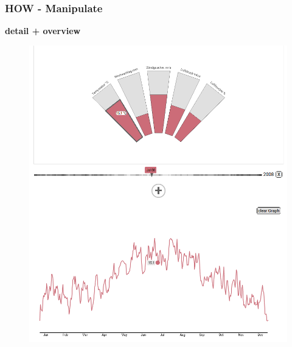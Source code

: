 \documentclass{beamer}
\begin{document}
  \begin{frame}
  \frametitle{HOW - Manipulate}
    \textbf{detail + overview}
    \begin{figure}[h]
      \centering
      \includegraphics[width=.4\paperwidth,keepaspectratio=true]{./media/overview_detail.png}
    \end{figure}
  \end{frame}
  
\end{document}
